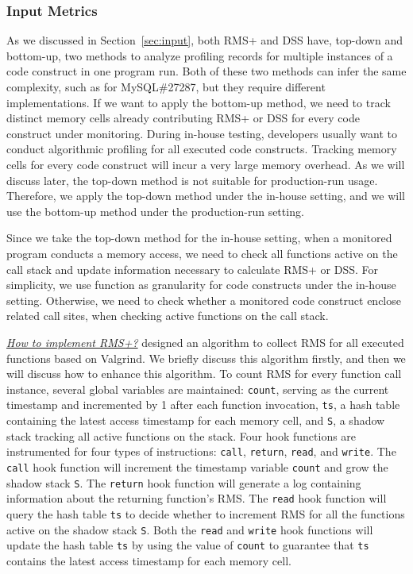 \subsubsection{Input Metrics}
As we discussed in Section~\ref{sec:input},
both RMS+ and DSS have, top-down and bottom-up, 
two methods to analyze profiling records for multiple instances of 
a code construct in one program run. 
Both of these two methods can infer the same complexity, 
such as for MySQL\#27287,
but they require different implementations.
If we want to apply the bottom-up method,
we need to track distinct memory cells already contributing 
RMS+ or DSS for every code construct under monitoring.
During in-house testing, developers usually want to conduct algorithmic profiling 
for all executed code constructs. 
Tracking memory cells for every code construct will 
incur a very large memory overhead.  
As we will discuss later, the top-down method 
is not suitable for production-run usage. 
Therefore, we apply the top-down method under the in-house setting, 
and we will use the bottom-up method under the production-run setting. 

Since we take the top-down method for the in-house setting,
when a monitored program conducts a memory access,
we need to check all functions active on the call stack and 
update information necessary to calculate RMS+ or DSS. 
For simplicity, we use function as granularity for code constructs under the in-house setting.
Otherwise, we need to check whether a monitored code construct enclose related call sites, 
when checking active functions on the call stack.  

{\textit{\underline{How to implement RMS+?}}}
\cite{Aprof1,Aprof2} designed an algorithm to collect 
RMS for all executed functions based on 
Valgrind. We briefly discuss this algorithm firstly, 
and then we will discuss how to enhance this algorithm. 
To count RMS for every function call instance, 
several global variables are maintained: 
\texttt{count}, serving as the current timestamp and incremented 
by 1 after each function invocation,  
\texttt{ts}, a hash table containing the latest access timestamp for each memory cell, 
and \texttt{S}, a shadow stack tracking all active functions on the stack. 
Four hook functions are instrumented for four types of instructions:
\texttt{call}, \texttt{return}, \texttt{read}, and \texttt{write}.
The \texttt{call} hook function will increment the timestamp variable \texttt{count} 
and grow the shadow stack \texttt{S}.
The \texttt{return} hook function will generate a 
log containing information about the returning function's RMS.
The \texttt{read} hook function will query the hash table \texttt{ts} to decide whether 
to increment RMS for all the functions active on the shadow stack \texttt{S}.
Both the \texttt{read} and \texttt{write} hook 
functions will update the hash table \texttt{ts}
by using the value of \texttt{count} to guarantee that \texttt{ts} 
contains the latest access timestamp for each memory cell. 

